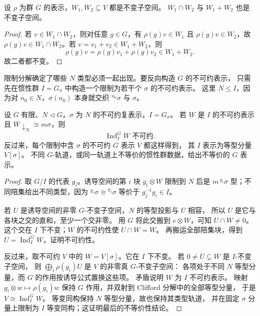 \begin{proposition}
设 $\rho$ 为群 $G$ 的表示，$W_1,W_2\subseteq V$ 都是不变子空间。 $W_1\cap W_2$ 与 $W_1+W_2$ 也是不变子空间。
\end{proposition}

\begin{proof}
若 $v\in W_1\cap W_2$，则对任意 $g\in G$，有 $\rho(g)v\in W_1$ 且 $\rho(g)v\in W_2$，故 $\rho(g)v\in W_1\cap W_2$。若 $v=v_1+v_2\in W_1+W_2$，则
\[
\rho(g)v=\rho(g)v_1+\rho(g)v_2\in W_1+W_2.
\]
故二者都不变。
\end{proof}

限制分解确定了哪些 $N$ 类型必须一起出现。要反向构造 $G$ 的不可约表示，
只需先在惯性群 $I=G_\sigma$ 中构造一个限制为若干个 $\sigma$ 的不可约表示。
这里 $N\le I$，因为对 $n_0\in N$，$\sigma(n_0)$ 本身就交织 ${}^{n_0}\sigma$ 与 $\sigma$。

\begin{proposition}
设 $G$ 有限、$N\triangleleft G$，$\sigma$ 为 $N$ 的不可约复表示，$I=G_\sigma$。
若 $W$ 是 $I$ 的不可约表示且 $W\downarrow_N\cong m\sigma$，则
\begin{equation}
\operatorname{Ind}_I^G W\text{ 不可约}.
\label{eq:clifford-induction}
\end{equation}
反过来，每个限制中含 $\sigma$ 的不可约 $G$ 表示 $V$ 都这样得到，
其 $I$ 表示为等型分量 $V[\sigma]$。
不同 $G$-轨道，或同一轨道上不等价的惯性群数据，给出不等价的 $G$ 表示。
\label{prop:clifford-little-group}
\end{proposition}

\begin{proof}
取 $G/I$ 的代表 $g_i$。诱导空间的第 $i$ 块 $g_i\otimes W$ 限制到 $N$ 后是
$m\,{}^{g_i}\sigma$ 型；不同陪集给出不同类型，因为
${}^{g_i}\sigma\cong{}^{g_j}\sigma$ 等价于 $g_j^{-1}g_i\in I$。

若 $U$ 是诱导空间的非零 $G$-不变子空间，$N$ 的等型投影与 $U$ 相容，
所以 $U$ 是它与各块之交的直和，至少一个交非零。
用 $G$ 将此交搬到 $e\otimes W$，可知 $U\cap W\ne0$。
这个交在 $I$ 下不变；$W$ 的不可约性使 $U\cap W=W$。
再搬运全部陪集块，得到 $U=\operatorname{Ind}_I^GW$，证明不可约性。

反过来，取不可约 $V$ 中的 $W=V[\sigma]$。它在 $I$ 下不变。
若 $0\ne U\subsetneq W$ 是 $I$-不变子空间，
则 $\bigoplus_i\rho(g_i)U$ 是 $V$ 的非零真 $G$-不变子空间：
各项处于不同 $N$ 等型分量，而 $G$ 的作用按诱导公式置换这些项。
矛盾说明 $W$ 为 $I$ 不可约表示。
映射 $g_i\otimes w\mapsto\rho(g_i)w$ 保持 $G$ 作用，并双射到 Clifford 分解中的全部等型分量，
于是 $V\cong\operatorname{Ind}_I^GW$。
等变同构保持 $N$ 等型分量，故也保持其类型轨道，
并在固定 $\sigma$ 分量上限制为 $I$ 等变同构；这证明最后的不等价性结论。
\end{proof}

